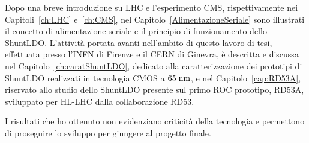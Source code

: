 
Dopo una breve introduzione su LHC e l'esperimento CMS, rispettivamente nei Capitoli~\ref{ch:LHC} e~\ref{ch:CMS}, nel Capitolo~\ref{AlimentazioneSeriale} sono illustrati il concetto di alimentazione seriale e il principio di funzionamento dello ShuntLDO. L'attivit\`a portata avanti nell'ambito di questo lavoro di tesi, effettuata presso l'INFN di Firenze e il CERN di Ginevra, \`e descritta e discussa nel  Capitolo~\ref{ch:caratShuntLDO}, dedicato alla caratterizzazione dei prototipi di ShuntLDO realizzati in tecnologia CMOS a $65\rm \; nm$, e nel Capitolo~\ref{cap:RD53A}, riservato allo studio dello ShuntLDO presente sul primo ROC prototipo, RD53A, sviluppato per HL-LHC dalla collaborazione RD53.

I risultati che ho ottenuto non evidenziano criticit\`a della tecnologia e permettono di proseguire lo sviluppo per giungere al progetto finale.




